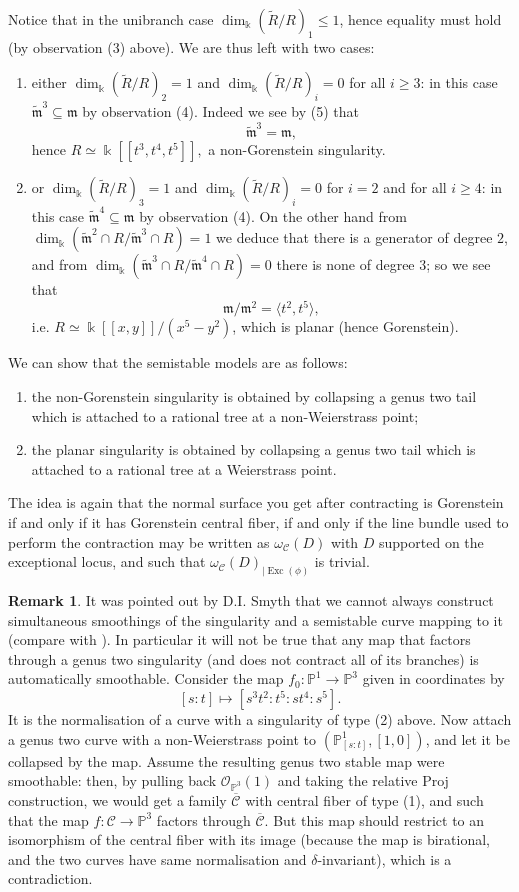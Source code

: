 \documentclass[11pt]{amsart}
\newcommand{\PP}{\mathbb P}
\newcommand{\OO}{\mathcal{O}}
\renewcommand{\to}{\rightarrow}
\newcommand{\kk}{\Bbbk}
\newcommand{\m}{\mathfrak m}
\newcommand{\tR}{\widetilde{R}}
\newcommand{\tm}{\widetilde{\mathfrak m}}
\theoremstyle{definition}
\theoremstyle{definition}
\newtheorem{rmk}[thm]{Remark}
\begin{document}
Notice that in the unibranch case $\dim_\kk(\tR/R)_1\leq 1$, hence equality must hold (by observation (3) above). We are thus left with two cases:
 \begin{enumerate}
  \item either $\dim_\kk(\tR/R)_2=1$ and $\dim_\kk(\tR/R)_i=0$ for all $i\geq 3$: in this case $\tm^3\subseteq\m$ by observation (4). Indeed we see by (5) that \[\tm^3=\m,\] hence $R\simeq\kk[\![t^3,t^4,t^5]\!],$ a non-Gorenstein singularity.
  
  \item or $\dim_\kk(\tR/R)_3=1$ and $\dim_\kk(\tR/R)_i=0$ for $i=2$ and for all $i\geq 4$: in this case $\tm^4\subseteq\m$ by observation (4). On the other hand from $\dim_\kk(\tm^2\cap R/\tm^3\cap R)=1$ we deduce that there is a generator of degree $2$, and from $\dim_\kk(\tm^3\cap R/\tm^4\cap R)=0$ there is none of degree $3$; so we see that \[\m/\m^2=\langle t^2,t^5\rangle,\] i.e. $R\simeq\kk[\![x,y]\!]/(x^5-y^2)$, which is planar (hence Gorenstein).
 \end{enumerate}

We can show that the semistable models are as follows:
 \begin{enumerate}
  \item the non-Gorenstein singularity is obtained by collapsing a genus two tail which is attached to a rational tree at a non-Weierstrass point;
  \item the planar singularity is obtained by collapsing a genus two tail which is attached to a rational tree at a Weierstrass point.
 \end{enumerate}
The idea is again that the normal surface you get after contracting is Gorenstein if and only if it has Gorenstein central fiber, if and only if the line bundle used to perform the contraction may be written as $\omega_{\mathcal C}(D)$ with $D$ supported on the exceptional locus, and such that $\omega_{\mathcal C}(D)_{|\operatorname{Exc}(\phi)}$ is trivial.

\begin{rmk}
 It was pointed out by D.I. Smyth that we cannot always construct simultaneous smoothings of the singularity and a semistable curve mapping to it (compare with \cite[Lemma 2.11]{BCM}). In particular it will not be true that any map that factors through a genus two singularity (and does not contract all of its branches) is automatically smoothable. Consider the map $f_0\colon\PP^1\to\PP^3$ given in coordinates by \[ [s:t]\mapsto[s^3t^2:t^5:st^4:s^5].\]
 It is the normalisation of a curve with a singularity of type (2) above. Now attach a genus two curve with a non-Weierstrass point to $(\PP^1_{[s:t]},[1,0])$, and let it be collapsed by the map. Assume the resulting genus two stable map were smoothable: then, by pulling back $\OO_{\PP^3}(1)$ and taking the relative Proj construction, we would get a family $\overline{\mathcal C}$ with central fiber of type (1), and such that the map $f\colon\mathcal C\to\PP^3$ factors through $\overline{\mathcal C}$. But this map should restrict to an isomorphism of the central fiber with its image (because the map is birational, and the two curves have same normalisation and $\delta$-invariant), which is a contradiction.
\end{rmk}
\end{document}
